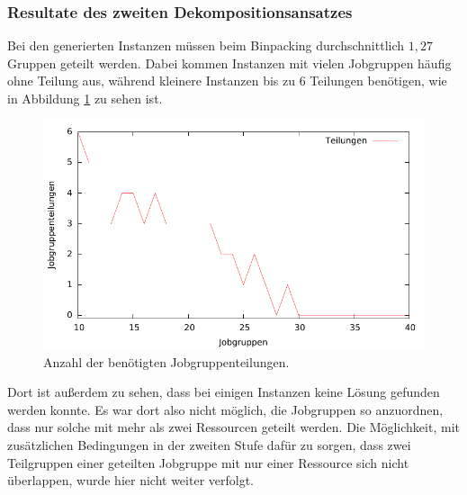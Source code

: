 \documentclass{scrreprt}
\begin{document}
\subsubsection{Resultate des zweiten Dekompositionsansatzes}
Bei den generierten Instanzen müssen beim Binpacking durchschnittlich $1{,}27$ Gruppen geteilt werden.
Dabei kommen Instanzen mit vielen Jobgruppen häufig ohne Teilung aus, während kleinere Instanzen bis zu $6$ Teilungen benötigen,
wie in Abbildung \ref{abb:plotsplits} zu sehen ist.
\begin{figure}
    \begin{center}
        \includegraphics[width=.8\textwidth]{../prog/binpacking/results/plotsplits.pdf}
    \end{center}
    \caption{
        \label{abb:plotsplits}
        Anzahl der benötigten Jobgruppenteilungen.
    }
\end{figure}
Dort ist außerdem zu sehen, dass bei einigen Instanzen keine Lösung gefunden werden konnte.
Es war dort also nicht möglich, die Jobgruppen so anzuordnen, dass nur solche mit mehr als zwei Ressourcen geteilt werden.
Die Möglichkeit, mit zusätzlichen Bedingungen in der zweiten Stufe dafür zu sorgen, 
dass zwei Teilgruppen einer geteilten Jobgruppe mit nur einer Ressource sich nicht überlappen, wurde hier nicht weiter verfolgt.
\end{document}
